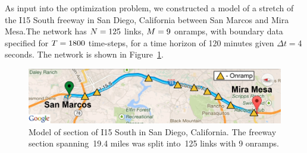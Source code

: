 		As input into the optimization problem, we constructed a model of
		a  stretch of the I15 South freeway in San Diego,
		California between San Marcos and Mira Mesa.The network has $N=125$ links, $M=9$ onramps,
		with boundary data specified for $T=1800$ time-steps,
		for a time horizon of 120 minutes given $\Delta t=$4 seconds.
		The network is shown in Figure~\ref{fig:Model-of-section}.
		\begin{figure}
			\begin{centering}
				\includegraphics[width=0.7\columnwidth]{images/map}
				\par\end{centering}
								
				\caption{Model of section of I15 South in San Diego, California. The freeway
					section spanning~19.4 miles was split into~125 links with 9 onramps.\label{fig:Model-of-section}}
				\end{figure}
								
